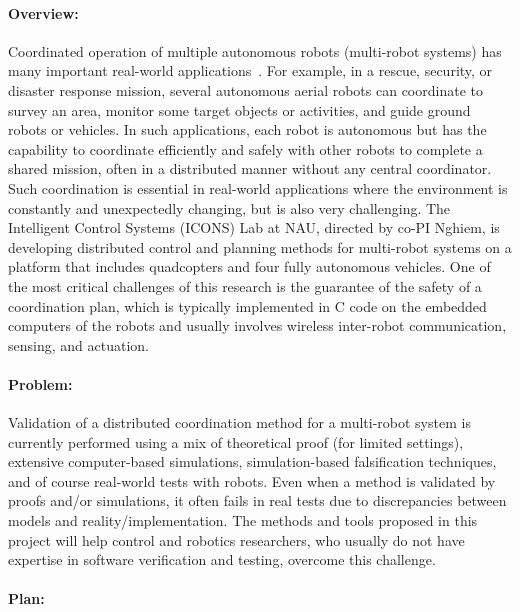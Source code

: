 
\paragraph{Overview:}

Coordinated operation of multiple autonomous robots (multi-robot systems) has many important real-world applications~\cite{multirobot2005,multirobotsurvey2013}.
For example, in a rescue, security, or disaster response mission, several autonomous aerial robots can coordinate to survey an area, monitor some target objects or activities, and guide ground robots or vehicles.
In such applications, each robot is autonomous but has the capability to coordinate efficiently and safely with other robots to complete a shared mission, often in a distributed manner without any central coordinator.
Such coordination is essential in real-world applications where the environment is constantly and unexpectedly changing, but is also very challenging.
The Intelligent Control Systems (ICONS) Lab at NAU, directed by co-PI Nghiem, is developing distributed control and planning methods for multi-robot systems on a platform that includes quadcopters and four fully autonomous vehicles.
One of the most critical challenges of this research is the guarantee of the safety of a coordination plan, which is typically implemented in C code on the embedded computers of the robots and usually involves wireless inter-robot communication, sensing, and actuation.

\paragraph{Problem:}

Validation of a distributed coordination method for a multi-robot system is currently performed using a mix of theoretical proof (for limited settings), extensive computer-based simulations, simulation-based falsification techniques, and of course real-world tests with robots.
Even when a method is validated by proofs and/or simulations, it often fails in real tests due to discrepancies between models and reality/implementation.
The methods and tools proposed in this project will help control and robotics researchers, who usually do not have expertise in software verification and testing, overcome this challenge.


\paragraph{Plan:}

